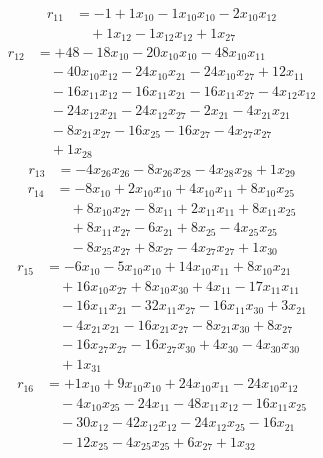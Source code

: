 \[\begin{aligned}
r_{11} &= - 1 + 1 x_{10} - 1 x_{10} x_{10} - 2 x_{10} x_{12} \\
 &\quad + 1 x_{12} - 1 x_{12} x_{12} + 1 x_{27}
\end{aligned}\]
\[\begin{aligned}
r_{12} &= + 48 - 18 x_{10} - 20 x_{10} x_{10} - 48 x_{10} x_{11} \\
 &\quad - 40 x_{10} x_{12} - 24 x_{10} x_{21} - 24 x_{10} x_{27} + 12 x_{11} \\
 &\quad - 16 x_{11} x_{12} - 16 x_{11} x_{21} - 16 x_{11} x_{27} - 4 x_{12} x_{12} \\
 &\quad - 24 x_{12} x_{21} - 24 x_{12} x_{27} - 2 x_{21} - 4 x_{21} x_{21} \\
 &\quad - 8 x_{21} x_{27} - 16 x_{25} - 16 x_{27} - 4 x_{27} x_{27} \\
 &\quad + 1 x_{28}
\end{aligned}\]
\[\begin{aligned}
r_{13} &= - 4 x_{26} x_{26} - 8 x_{26} x_{28} - 4 x_{28} x_{28} + 1 x_{29}
\end{aligned}\]
\[\begin{aligned}
r_{14} &= - 8 x_{10} + 2 x_{10} x_{10} + 4 x_{10} x_{11} + 8 x_{10} x_{25} \\
 &\quad + 8 x_{10} x_{27} - 8 x_{11} + 2 x_{11} x_{11} + 8 x_{11} x_{25} \\
 &\quad + 8 x_{11} x_{27} - 6 x_{21} + 8 x_{25} - 4 x_{25} x_{25} \\
 &\quad - 8 x_{25} x_{27} + 8 x_{27} - 4 x_{27} x_{27} + 1 x_{30}
\end{aligned}\]
\[\begin{aligned}
r_{15} &= - 6 x_{10} - 5 x_{10} x_{10} + 14 x_{10} x_{11} + 8 x_{10} x_{21} \\
 &\quad + 16 x_{10} x_{27} + 8 x_{10} x_{30} + 4 x_{11} - 17 x_{11} x_{11} \\
 &\quad - 16 x_{11} x_{21} - 32 x_{11} x_{27} - 16 x_{11} x_{30} + 3 x_{21} \\
 &\quad - 4 x_{21} x_{21} - 16 x_{21} x_{27} - 8 x_{21} x_{30} + 8 x_{27} \\
 &\quad - 16 x_{27} x_{27} - 16 x_{27} x_{30} + 4 x_{30} - 4 x_{30} x_{30} \\
 &\quad + 1 x_{31}
\end{aligned}\]
\[\begin{aligned}
r_{16} &= + 1 x_{10} + 9 x_{10} x_{10} + 24 x_{10} x_{11} - 24 x_{10} x_{12} \\
 &\quad - 4 x_{10} x_{25} - 24 x_{11} - 48 x_{11} x_{12} - 16 x_{11} x_{25} \\
 &\quad - 30 x_{12} - 42 x_{12} x_{12} - 24 x_{12} x_{25} - 16 x_{21} \\
 &\quad - 12 x_{25} - 4 x_{25} x_{25} + 6 x_{27} + 1 x_{32}
\end{aligned}\]

